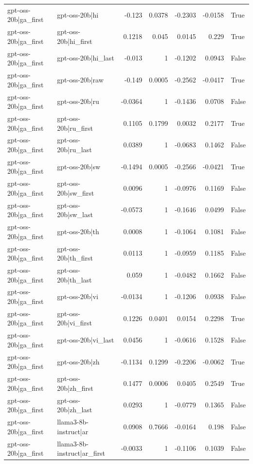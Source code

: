 \begin{table}
\begin{tabular}{l l r r r r l}
gpt-oss-20b|ga_first & gpt-oss-20b|hi & -0.123 & 0.0378 & -0.2303 & -0.0158 & True \\
gpt-oss-20b|ga_first & gpt-oss-20b|hi_first & 0.1218 & 0.045 & 0.0145 & 0.229 & True \\
gpt-oss-20b|ga_first & gpt-oss-20b|hi_last & -0.013 & 1 & -0.1202 & 0.0943 & False \\
gpt-oss-20b|ga_first & gpt-oss-20b|raw & -0.149 & 0.0005 & -0.2562 & -0.0417 & True \\
gpt-oss-20b|ga_first & gpt-oss-20b|ru & -0.0364 & 1 & -0.1436 & 0.0708 & False \\
gpt-oss-20b|ga_first & gpt-oss-20b|ru_first & 0.1105 & 0.1799 & 0.0032 & 0.2177 & True \\
gpt-oss-20b|ga_first & gpt-oss-20b|ru_last & 0.0389 & 1 & -0.0683 & 0.1462 & False \\
gpt-oss-20b|ga_first & gpt-oss-20b|sw & -0.1494 & 0.0005 & -0.2566 & -0.0421 & True \\
gpt-oss-20b|ga_first & gpt-oss-20b|sw_first & 0.0096 & 1 & -0.0976 & 0.1169 & False \\
gpt-oss-20b|ga_first & gpt-oss-20b|sw_last & -0.0573 & 1 & -0.1646 & 0.0499 & False \\
gpt-oss-20b|ga_first & gpt-oss-20b|th & 0.0008 & 1 & -0.1064 & 0.1081 & False \\
gpt-oss-20b|ga_first & gpt-oss-20b|th_first & 0.0113 & 1 & -0.0959 & 0.1185 & False \\
gpt-oss-20b|ga_first & gpt-oss-20b|th_last & 0.059 & 1 & -0.0482 & 0.1662 & False \\
gpt-oss-20b|ga_first & gpt-oss-20b|vi & -0.0134 & 1 & -0.1206 & 0.0938 & False \\
gpt-oss-20b|ga_first & gpt-oss-20b|vi_first & 0.1226 & 0.0401 & 0.0154 & 0.2298 & True \\
gpt-oss-20b|ga_first & gpt-oss-20b|vi_last & 0.0456 & 1 & -0.0616 & 0.1528 & False \\
gpt-oss-20b|ga_first & gpt-oss-20b|zh & -0.1134 & 0.1299 & -0.2206 & -0.0062 & True \\
gpt-oss-20b|ga_first & gpt-oss-20b|zh_first & 0.1477 & 0.0006 & 0.0405 & 0.2549 & True \\
gpt-oss-20b|ga_first & gpt-oss-20b|zh_last & 0.0293 & 1 & -0.0779 & 0.1365 & False \\
gpt-oss-20b|ga_first & llama3-8b-instruct|ar & 0.0908 & 0.7666 & -0.0164 & 0.198 & False \\
gpt-oss-20b|ga_first & llama3-8b-instruct|ar_first & -0.0033 & 1 & -0.1106 & 0.1039 & False \\

\end{tabular}
\end{table}
